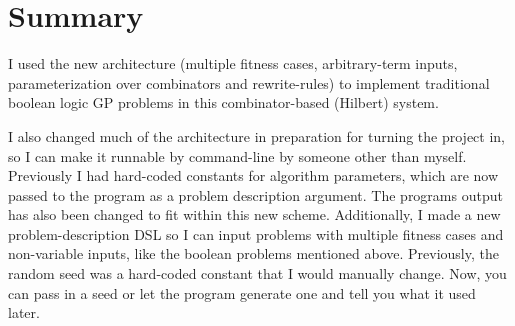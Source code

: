 \documentclass{article}
\begin{document}
\maketitle

\section{Summary}

I used the new architecture (multiple fitness cases, arbitrary-term
inputs, parameterization over combinators and rewrite-rules) to
implement traditional boolean logic GP problems in this
combinator-based (Hilbert) system.

I also changed much of the architecture in preparation for turning the
project in, so I can make it runnable by command-line by someone other
than myself. Previously I had hard-coded constants for algorithm
parameters, which are now passed to the program as a problem
description argument. The programs output has also been changed to fit
within this new scheme. Additionally, I made a new problem-description
DSL so I can input problems with multiple fitness cases and
non-variable inputs, like the boolean problems mentioned above.
Previously, the random seed was a hard-coded constant that I would
manually change. Now, you can pass in a seed or let the program
generate one and tell you what it used later.
\end{document}

